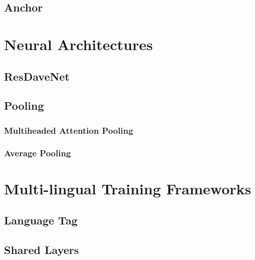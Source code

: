 \subsection{Anchor}
\label{section:anchor_framework}
\section{Neural Architectures}
\subsection{ResDaveNet}
\subsection{Pooling}
\subsubsection{Multiheaded Attention Pooling}
\subsubsection{Average Pooling}
\section{Multi-lingual Training Frameworks}
\subsection{Language Tag}
\subsection{Shared Layers}
